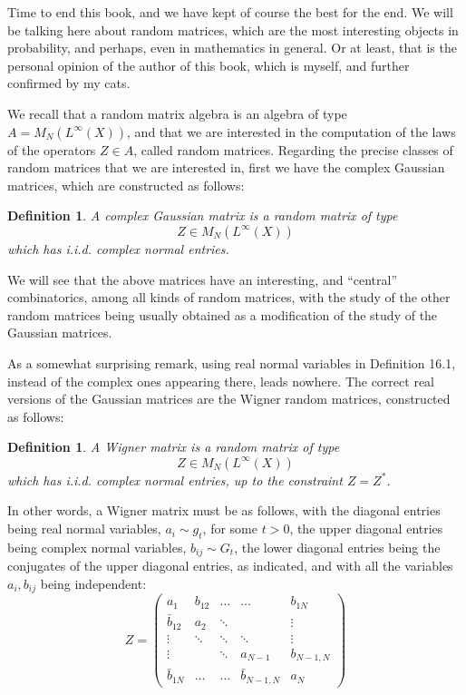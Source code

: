 \documentclass[12pt]{amsbook}
\newtheorem{definition}[theorem]{Definition}
\begin{document}
Time to end this book, and we have kept of course the best for the end. We will be talking here about random matrices, which are the most interesting objects in probability, and perhaps, even in mathematics in general. Or at least, that is the personal opinion of the author of this book, which is myself, and further confirmed by my cats.

\bigskip

We recall that a random matrix algebra is an algebra of type $A=M_N(L^\infty(X))$, and that we are interested in the computation of the laws of the operators $Z\in A$, called random matrices. Regarding the precise classes of random matrices that we are interested in, first we have the complex Gaussian matrices, which are constructed as follows:

\begin{definition}
A complex Gaussian matrix is a random matrix of type
$$Z\in M_N(L^\infty(X))$$
which has i.i.d. complex normal entries.
\end{definition}

We will see that the above matrices have an interesting, and ``central'' combinatorics, among all kinds of random matrices, with the study of the other random matrices being usually obtained as a modification of the study of the Gaussian matrices.

\bigskip

As a somewhat surprising remark, using real normal variables in Definition 16.1, instead of the complex ones appearing there, leads nowhere. The correct real versions of the Gaussian matrices are the Wigner random matrices, constructed as follows: 

\begin{definition}
A Wigner matrix is a random matrix of type
$$Z\in M_N(L^\infty(X))$$
which has i.i.d. complex normal entries, up to the constraint $Z=Z^*$.
\end{definition}

In other words, a Wigner matrix must be as follows, with the diagonal entries being real normal variables, $a_i\sim g_t$, for some $t>0$, the upper diagonal entries being complex normal variables, $b_{ij}\sim G_t$, the lower diagonal entries being the conjugates of the upper diagonal entries, as indicated, and with all the variables $a_i,b_{ij}$ being independent: 
$$Z=\begin{pmatrix}
a_1&b_{12}&\ldots&\ldots&b_{1N}\\
\bar{b}_{12}&a_2&\ddots&&\vdots\\
\vdots&\ddots&\ddots&\ddots&\vdots\\
\vdots&&\ddots&a_{N-1}&b_{N-1,N}\\
\bar{b}_{1N}&\ldots&\ldots&\bar{b}_{N-1,N}&a_N
\end{pmatrix}$$
\end{document}
